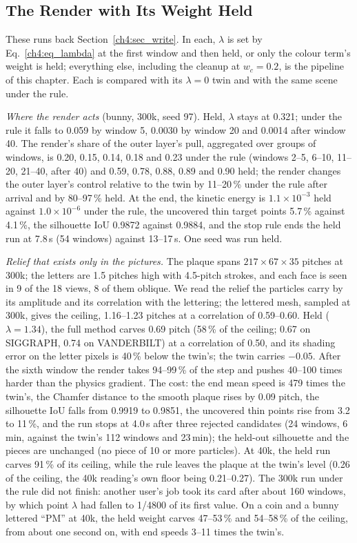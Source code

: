 \subsection{The Render with Its Weight Held}
\label{app:ch4_held}
These runs back Section~\ref{ch4:sec_write}. In each, $\lambda$ is set by Eq.~\eqref{ch4:eq_lambda} at the first window
and then held, or only the colour term's weight is held; everything else, including the cleanup at $w_c=0.2$, is the
pipeline of this chapter. Each is compared with its $\lambda=0$ twin and with the same scene under the rule.

\textit{Where the render acts} (bunny, 300k, seed 97). Held, $\lambda$ stays at 0.321; under the rule it falls to 0.059 by
window 5, 0.0030 by window 20 and 0.0014 after window 40. The render's share of the outer layer's pull, aggregated over
groups of windows, is 0.20, 0.15, 0.14, 0.18 and 0.23 under the rule (windows 2--5, 6--10, 11--20, 21--40, after 40) and
0.59, 0.78, 0.88, 0.89 and 0.90 held; the render changes the outer layer's control relative to the twin by 11--20\,\%
under the rule after arrival and by 80--97\,\% held. At the end, the kinetic energy is $1.1\times10^{-3}$ held against
$1.0\times10^{-6}$ under the rule, the uncovered thin target points 5.7\,\% against 4.1\,\%, the silhouette IoU 0.9872
against 0.9884, and the stop rule ends the held run at 7.8\,s (54 windows) against 13--17\,s. One seed was run held.

\textit{Relief that exists only in the pictures.} The plaque spans $217\times67\times35$ pitches at 300k; the letters are
1.5 pitches high with 4.5-pitch strokes, and each face is seen in 9 of the 18 views, 8 of them oblique. We read the relief
the particles carry by its amplitude and its correlation with the lettering; the lettered mesh, sampled at 300k, gives the
ceiling, 1.16--1.23 pitches at a correlation of 0.59--0.60. Held ($\lambda=1.34$), the full method carves 0.69 pitch
(58\,\% of the ceiling; 0.67 on SIGGRAPH, 0.74 on VANDERBILT) at a correlation of 0.50, and its shading error on the
letter pixels is 40\,\% below the twin's; the twin carries $-0.05$. After the sixth window the render takes 94--99\,\% of
the step and pushes 40--100 times harder than the physics gradient. The cost: the end mean speed is 479 times the twin's,
the Chamfer distance to the smooth plaque rises by 0.09 pitch, the silhouette IoU falls from 0.9919 to 0.9851, the
uncovered thin points rise from 3.2 to 11\,\%, and the run stops at 4.0\,s after three rejected candidates (24 windows,
6\,min, against the twin's 112 windows and 23\,min); the held-out silhouette and the pieces are unchanged (no piece of 10 or
more particles). At 40k, the held run carves 91\,\% of its ceiling, while the rule leaves the plaque at the twin's level
(0.26 of the ceiling, the 40k reading's own floor being 0.21--0.27). The 300k run under the rule did not finish: another
user's job took its card after about 160 windows, by which point $\lambda$ had fallen to 1/4800 of its first value. On a
coin and a bunny lettered ``PM'' at 40k, the held weight carves 47--53\,\% and 54--58\,\% of the ceiling, from about one
second on, with end speeds 3--11 times the twin's.

